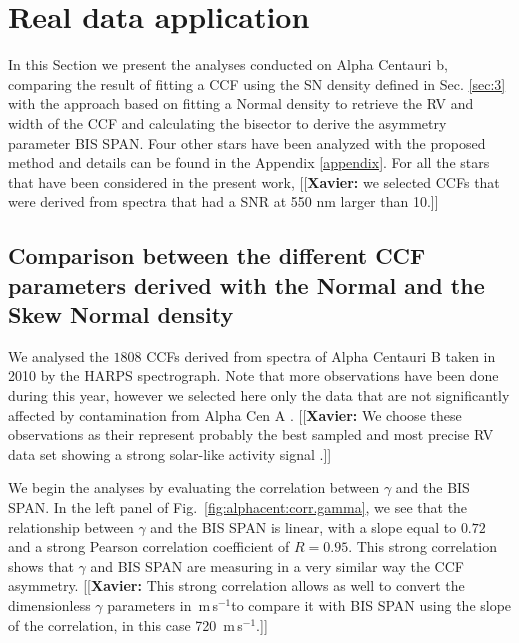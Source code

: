 \documentclass{aa}
\def\ms{\hbox{\,m\,s$^{-1}$}}         %
\newcommand{\xavier}[1]{{\color{blue}[[\textbf{Xavier: }#1]]}}
\begin{document}
\section{Real data application} \label{sec:4}

In this Section we present the analyses conducted on Alpha Centauri b, comparing the result of fitting a CCF using the SN density defined in Sec. \ref{sec:3} with the approach based on fitting a Normal density to retrieve the RV and width of the CCF and calculating the bisector to derive the asymmetry parameter BIS SPAN. Four other stars have been analyzed with the proposed method and details can be found in the Appendix \ref{appendix}. For all the stars that have been considered in the present work, \xavier{we selected CCFs  that were derived from spectra that had a SNR at 550 nm larger than 10.}


\subsection{Comparison between the different CCF parameters derived with the Normal and the Skew Normal density} \label{sec:alphacentb}

We analysed the $1808$ CCFs derived from spectra of Alpha Centauri B taken in 2010 by the HARPS spectrograph. Note that more observations have been done during this year, however we selected here only the data that are not significantly affected by contamination from Alpha Cen A \citep[see][]{Dumusque-2012}. \xavier{We choose these observations as their represent probably the best sampled and most precise RV data set showing a strong solar-like activity signal \citep{Thompson-2017, Dumusque-2012}.}

We begin the analyses by evaluating the correlation between $\gamma$ and the BIS SPAN. 
In the left panel of Fig.~\ref{fig:alphacent:corr.gamma}, we see that the relationship between $\gamma$ and the BIS SPAN is linear, with a slope equal to $0.72$ and a strong Pearson correlation coefficient of $R=0.95$. This strong correlation shows that $\gamma$ and BIS SPAN are measuring in a very similar way the CCF asymmetry. \xavier{This strong correlation allows as well to convert the dimensionless $\gamma$ parameters in \ms to compare it with BIS SPAN using the slope of the correlation, in this case 720 \ms.}
\end{document}
